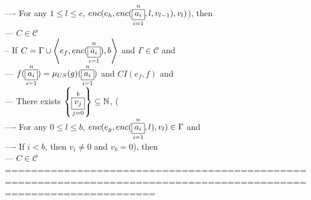 \documentclass{book}
\newcommand{\inot}{\not}
\newcommand{\set}[1]{\left\{ #1 \right\}}
\newcommand{\seq}[1]{\left\langle #1 \right\rangle}
\newcommand{\vdc}[3]{\underset{#2}{\overset{#3}{\fbox{$#1$}}}}
\begin{document}
				---- For any $1 \leq l \leq c$, $enc(e_h, enc(\vdc{a_i}{i=1}{n}, l, v_{l-1}), v_l)$), then \\
			--- $C \in \mathcal{C}$ \\
		-- If $C = \Gamma \cup \seq{e_f, enc(\vdc{a_i}{i=1}{n}), b}$ and $\Gamma \in \mathcal{C}$ and \\
			--- $f(\vdc{a_i}{i=1}{n}) = \mu_{US}(g)(\vdc{a_i}{i=1}{n})$ and $CI(e_f, f)$ and \\
			--- There exists $\set{\vdc{v_j}{j=0}{b}} \subseteq \mathbb{N}$, ( \\
				---- For any $0 \leq l \leq b$, $enc(e_g, enc(\vdc{a_i}{i=1}{n}, l), v_l) \in \Gamma$ and \\
				---- If $i < b$, then $v_i \inot = 0$ and $v_b = 0$), then \\
			--- $C \in \mathcal{C}$ \\
	===================================================================================================================
\end{document}
